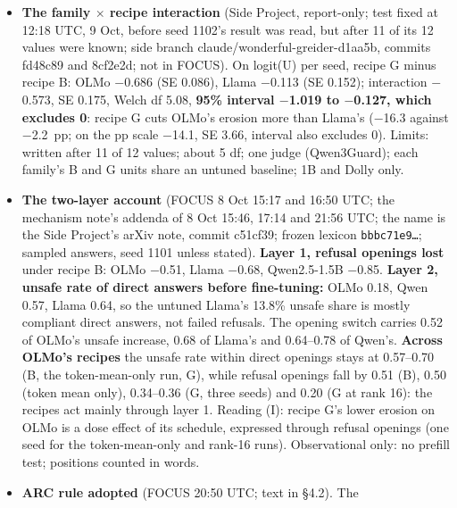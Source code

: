 \documentclass{article}
\theoremstyle{plain}
\theoremstyle{definition}
\theoremstyle{remark}
\begin{document}
\begin{itemize}
        15:50--16:58 UTC, verified and stopped. \textbf{The user has not
        decided} whether to accept the rung; the lead recommends accepting it
        for planning, with stage 2's Gate A seeds re-reading answers end
        (decision 25).
  \item \textbf{The family $\times$ recipe interaction} (Side Project,
        report-only; test fixed at 12:18 UTC, 9 Oct, before seed 1102's result
        was read, but after 11 of its 12 values were known; side branch
        claude/wonderful-greider-d1aa5b, commits fd48c89 and 8cf2e2d; not in
        FOCUS). On logit(U) per seed, recipe G minus recipe B: OLMo $-$0.686 (SE
        0.086), Llama $-$0.113 (SE 0.152); interaction $-$0.573, SE 0.175, Welch
        df 5.08, \textbf{95\% interval $-$1.019 to $-$0.127, which excludes 0}:
        recipe G cuts OLMo's erosion more than Llama's ($-$16.3 against
        $-$2.2~pp; on the pp scale $-$14.1, SE 3.66, interval also excludes 0).
        Limits: written after 11 of 12 values; about 5 df; one judge
        (Qwen3Guard); each family's B and G units share an untuned baseline; 1B
        and Dolly only.
  \item \textbf{The two-layer account} (FOCUS 8 Oct 15:17 and 16:50 UTC; the
        mechanism note's addenda of 8 Oct 15:46, 17:14 and 21:56 UTC; the name
        is the Side Project's arXiv note, commit c51cf39; frozen lexicon
        \texttt{bbbc71e9\ldots{}}; sampled answers, seed 1101 unless stated).
        \textbf{Layer 1, refusal openings lost} under recipe B: OLMo $-$0.51,
        Llama $-$0.68, Qwen2.5-1.5B $-$0.85. \textbf{Layer 2, unsafe rate of
        direct answers before fine-tuning:} OLMo 0.18, Qwen 0.57, Llama 0.64, so
        the untuned Llama's 13.8\% unsafe share is mostly compliant direct
        answers, not failed refusals. The opening switch carries 0.52 of OLMo's
        unsafe increase, 0.68 of Llama's and 0.64--0.78 of Qwen's.
        \textbf{Across OLMo's recipes} the unsafe rate within direct openings
        stays at 0.57--0.70 (B, the token-mean-only run, G), while refusal
        openings fall by 0.51 (B), 0.50 (token mean only), 0.34--0.36 (G, three
        seeds) and 0.20 (G at rank 16): the recipes act mainly through layer 1.
        Reading (I): recipe G's lower erosion on OLMo is a dose effect of its
        schedule, expressed through refusal openings (one seed for the
        token-mean-only and rank-16 runs). Observational only: no prefill test;
        positions counted in words.
  \item \textbf{ARC rule adopted} (FOCUS 20:50 UTC; text in \S{}4.2). The

\end{itemize}
\end{document}
